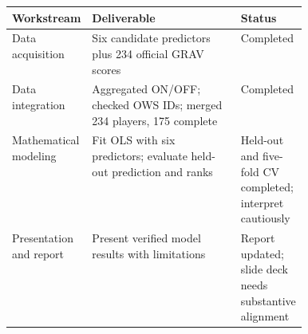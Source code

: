 \documentclass[11pt]{article}
\begin{document}
\begin{center}
\small
\begin{tabularx}{\linewidth}{@{}p{0.24\linewidth}Xp{0.19\linewidth}@{}}
\toprule
\textbf{Workstream} & \textbf{Deliverable} & \textbf{Status}\\
\midrule
Data acquisition & Six candidate predictors plus 234 official GRAV scores & Completed\\
Data integration & Aggregated ON/OFF; checked OWS IDs; merged 234 players, 175 complete & Completed\\
Mathematical modeling & Fit OLS with six predictors; evaluate held-out prediction and ranks & Held-out and five-fold CV completed; interpret cautiously\\
Presentation and report & Present verified model results with limitations & Report updated; slide deck needs substantive alignment\\
\bottomrule
\end{tabularx}
\end{center}
\end{document}
